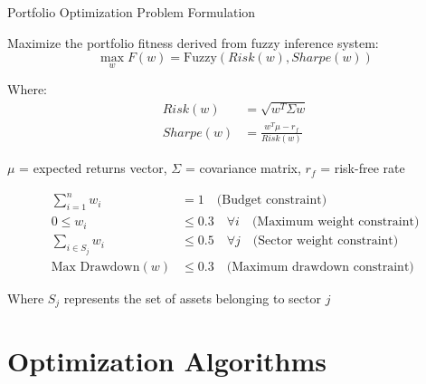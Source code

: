\documentclass[aspectratio=169,xcolor=table]{beamer}
\begin{document}
\begin{frame}{Portfolio Optimization Problem Formulation}
  \begin{tcolorbox}[
    enhanced,
    colback=blue!5,
    colframe=blue!70,
    arc=2mm,
    title=Objective Function,
    fonttitle=\bfseries\large,
    boxrule=0.5mm
  ]
    Maximize the portfolio fitness derived from fuzzy inference system:
    \begin{equation}
      \max_{w} F(w) = \text{Fuzzy}(Risk(w), Sharpe(w))
    \end{equation}
    
    Where:
    \begin{align}
      Risk(w) &= \sqrt{w^T \Sigma w} \\
      Sharpe(w) &= \frac{w^T \mu - r_f}{Risk(w)}
    \end{align}
    
    $\mu$ = expected returns vector, $\Sigma$ = covariance matrix, $r_f$ = risk-free rate
  \end{tcolorbox}
  
  \vspace{0.3cm}
  
  \begin{tcolorbox}[
    enhanced,
    colback=blue!5,
    colframe=blue!70,
    arc=2mm,
    title=Constraints,
    fonttitle=\bfseries\large,
    boxrule=0.5mm
  ]
    \begin{align}
      \sum_{i=1}^{n} w_i &= 1 \quad \text{(Budget constraint)} \\
      0 \leq w_i &\leq 0.3 \quad \forall i \quad \text{(Maximum weight constraint)} \\
      \sum_{i \in S_j} w_i &\leq 0.5 \quad \forall j \quad \text{(Sector weight constraint)} \\
      \text{Max Drawdown}(w) &\leq 0.3 \quad \text{(Maximum drawdown constraint)}
    \end{align}
    
    Where $S_j$ represents the set of assets belonging to sector $j$
  \end{tcolorbox}
\end{frame}

\section{Optimization Algorithms}
\end{document}
